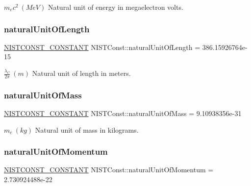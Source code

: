 $m_e c^2 \ (MeV)$ Natural unit of energy in megaelectron volts. \mbox{\label{group___n_i_s_t_const-_natural_unit_ga746fb3dd81ed728c99e5f78ccbc3c15f}} 
\subsubsection{\texorpdfstring{natural\+Unit\+Of\+Length}{naturalUnitOfLength}}
{\footnotesize\ttfamily \mbox{\hyperlink{_n_i_s_t_const_8hpp_a2b0fc1d7452373f816175dd86ce26729}{N\+I\+S\+T\+C\+O\+N\+S\+T\+\_\+\+C\+O\+N\+S\+T\+A\+NT}} N\+I\+S\+T\+Const\+::natural\+Unit\+Of\+Length = 386.\+15926764e-\/15}

$\frac{\lambda_C}{2\pi} \ (m)$ Natural unit of length in meters. \mbox{\label{group___n_i_s_t_const-_natural_unit_gaf95361f1122cce12b7ad6fa77e75bcd5}} 
\subsubsection{\texorpdfstring{natural\+Unit\+Of\+Mass}{naturalUnitOfMass}}
{\footnotesize\ttfamily \mbox{\hyperlink{_n_i_s_t_const_8hpp_a2b0fc1d7452373f816175dd86ce26729}{N\+I\+S\+T\+C\+O\+N\+S\+T\+\_\+\+C\+O\+N\+S\+T\+A\+NT}} N\+I\+S\+T\+Const\+::natural\+Unit\+Of\+Mass = 9.\+10938356e-\/31}

$m_e \ (kg)$ Natural unit of mass in kilograms. \mbox{\label{group___n_i_s_t_const-_natural_unit_ga020a191050aee0f8de449b86901efcab}} 
\subsubsection{\texorpdfstring{natural\+Unit\+Of\+Momentum}{naturalUnitOfMomentum}}
{\footnotesize\ttfamily \mbox{\hyperlink{_n_i_s_t_const_8hpp_a2b0fc1d7452373f816175dd86ce26729}{N\+I\+S\+T\+C\+O\+N\+S\+T\+\_\+\+C\+O\+N\+S\+T\+A\+NT}} N\+I\+S\+T\+Const\+::natural\+Unit\+Of\+Momentum = 2.\+730924488e-\/22}

